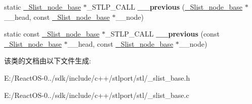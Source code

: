 \begin{DoxyCompactItemize}
static \hyperlink{struct___slist__node__base}{\+\_\+\+Slist\+\_\+node\+\_\+base} $\ast$\+\_\+\+S\+T\+L\+P\+\_\+\+C\+A\+LL {\bfseries \+\_\+\+\_\+previous} (\hyperlink{struct___slist__node__base}{\+\_\+\+Slist\+\_\+node\+\_\+base} $\ast$\+\_\+\+\_\+head, const \hyperlink{struct___slist__node__base}{\+\_\+\+Slist\+\_\+node\+\_\+base} $\ast$\+\_\+\+\_\+node)
\item 
\mbox{\label{class___sl__global_a9990d3699385ff3abd9bda19c425e598}} 
static const \hyperlink{struct___slist__node__base}{\+\_\+\+Slist\+\_\+node\+\_\+base} $\ast$\+\_\+\+S\+T\+L\+P\+\_\+\+C\+A\+LL {\bfseries \+\_\+\+\_\+previous} (const \hyperlink{struct___slist__node__base}{\+\_\+\+Slist\+\_\+node\+\_\+base} $\ast$\+\_\+\+\_\+head, const \hyperlink{struct___slist__node__base}{\+\_\+\+Slist\+\_\+node\+\_\+base} $\ast$\+\_\+\+\_\+node)
\end{DoxyCompactItemize}


该类的文档由以下文件生成\+:\begin{DoxyCompactItemize}
\item 
E\+:/\+React\+O\+S-\/0../sdk/include/c++/stlport/stl/\+\_\+slist\+\_\+base.\+h\item 
E\+:/\+React\+O\+S-\/0../sdk/include/c++/stlport/stl/\+\_\+slist\+\_\+base.\+c\end{DoxyCompactItemize}
